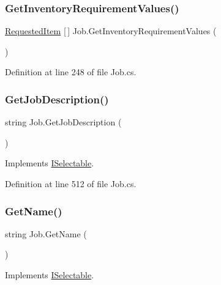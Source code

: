 \subsubsection{\texorpdfstring{Get\+Inventory\+Requirement\+Values()}{GetInventoryRequirementValues()}}
{\footnotesize\ttfamily \hyperlink{class_project_porcupine_1_1_jobs_1_1_requested_item}{Requested\+Item} \mbox{[}$\,$\mbox{]} Job.\+Get\+Inventory\+Requirement\+Values (\begin{DoxyParamCaption}{ }\end{DoxyParamCaption})}



Definition at line 248 of file Job.\+cs.

\mbox{\label{class_job_a7161746f9a93cc8dc204a01ca01cf2fa}} 
\subsubsection{\texorpdfstring{Get\+Job\+Description()}{GetJobDescription()}}
{\footnotesize\ttfamily string Job.\+Get\+Job\+Description (\begin{DoxyParamCaption}{ }\end{DoxyParamCaption})}



Implements \hyperlink{interface_i_selectable_a4d0f9fa51a3d70a7fbcbb39e126e4c73}{I\+Selectable}.



Definition at line 512 of file Job.\+cs.

\mbox{\label{class_job_a250a84373e09871c23aab690829e91af}} 
\subsubsection{\texorpdfstring{Get\+Name()}{GetName()}}
{\footnotesize\ttfamily string Job.\+Get\+Name (\begin{DoxyParamCaption}{ }\end{DoxyParamCaption})}



Implements \hyperlink{interface_i_selectable_af676ba50e2cd5839438d3092743a79da}{I\+Selectable}.



